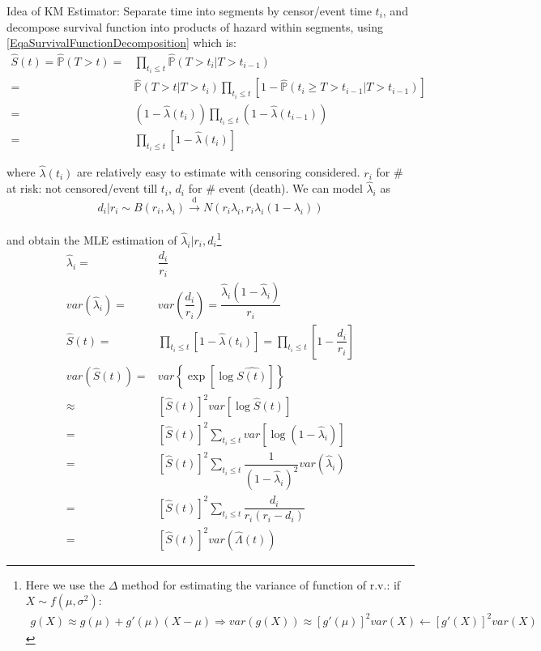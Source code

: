 Idea of KM Estimator: Separate time into segments by censor/event time $ t_i $, and decompose survival function into products of hazard within segments, using \autoref{EqaSurvivalFunctionDecomposition} which is:
\begin{align}
    \hat{S}(t)=\hat{\mathbb{P}}(T>t)=&\prod_{t_i\leq t}\hat{\mathbb{P}}\left( T>t_i |T>t_{i-1}  \right) \\
    =&\hat{\mathbb{P}}\left( T>t|T>t_i \right)  \prod_{t_i\leq t}\left[1- \hat{\mathbb{P}}\left( t_{i}\geq T>t_{i-1} |T>t_{i-1}\right) \right]\\
    =&\left(1-\hat{\lambda }(t_i)\right)\prod_{t_i\leq t}\left(1-\hat{\lambda }(t_{i-1})\right)\\
    =&\prod_{t_i\leq t}\left[1-\hat{\lambda }(t_i)\right]
\end{align}

where $ \hat{\lambda }(t_i) $ are relatively easy to estimate with censoring considered. $ r_i $ for \# at risk: not censored/event till $ t_i $, $ d_i $ for \# event (death). We can model $ \hat{\lambda }_i $ as
\begin{equation}
    d_i\big|r_i \sim B(r_i,\lambda _i)\xrightarrow[]{\mathrm{d}} N(r_i\lambda _i,r_i\lambda _i(1-\lambda _i))
\end{equation}

and obtain the MLE estimation of $ \hat{\lambda }_i|r_i,d_i $\footnote{Here we use the $ \Delta  $ method for estimating the variance of function of r.v.: if $ X\sim f(\mu ,\sigma ^2) $:
\begin{align}
    g(X)\approx g(\mu )+g'(\mu )(X-\mu )\Rightarrow var(g(X))\approx [g'(\mu )]^2var(X)\leftarrow [g'(X)]^2var(X)
\end{align}}
\begin{align}
    \hat{\lambda }_i=&\dfrac{d_i}{r_i}\\
    var(\hat{\lambda }_i)=&var(\dfrac{d_i}{r_i})=\dfrac{\hat{\lambda }_i(1-\hat{\lambda }_i)}{r_i}\\
    \hat{S}(t)=&\prod_{t_i\leq t}\left[1-\hat{\lambda }(t_i)\right]=\prod_{t_i\leq t}\left[1-\dfrac{d_i}{r_i}\right]\tag{KM Estimator}\\
    var(\hat{S}(t))=&var\left\{ \exp\left[ \log\hat{S(t)} \right] \right\}\\
    \approx&[\hat{S}(t)]^2var\left[\log \hat{S}(t)\right]\\
    =&[\hat{S}(t)]^2\sum_{t_i\leq t}var\left[\log (1-\hat{\lambda }_i) \right]\\
    =&[\hat{S}(t)]^2\sum_{t_i\leq t}\dfrac{1}{(1-\hat{\lambda }_i)^2}var(\hat{\lambda }_i)\\
    =&[\hat{S}(t)]^2\sum_{t_i\leq t}\dfrac{d_i}{r_i(r_i-d_i)}\tag{Greenwood's Formula}\\
    =&[\hat{S}(t)]^2var(\hat{\Lambda }(t))
\end{align}

